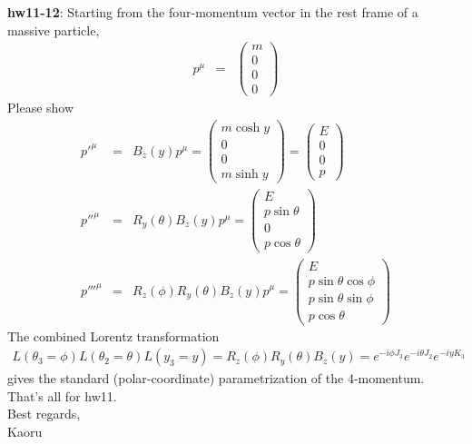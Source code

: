 \documentclass[12pt]{article}
\begin{document}
{\bf hw11-12}:
  Starting from the four-momentum vector in the rest frame of a massive
  particle,
\begin{eqnarray}
  p^\mu &=& 
  \begin{pmatrix}
    m \\ 0 \\ 0 \\ 0
  \end{pmatrix}
\end{eqnarray}
  Please show
\begin{eqnarray}
  {p'}^\mu &=& B_z(y) p^\mu =
  \begin{pmatrix}
    m \cosh y \\ 0 \\ 0 \\ m \sinh y 
  \end{pmatrix}
  =
  \begin{pmatrix}
   E \\ 0 \\ 0 \\ p
  \end{pmatrix} \\
 {p{''}}^\mu &=& R_y(\theta)B_z(y) p^\mu =
  \begin{pmatrix}
    E \\ p \sin\theta \\ 0 \\ p\cos\theta
  \end{pmatrix} \\
  {p{'''}}^\mu &=& R_z(\phi)R_y(\theta)B_z(y) p^\mu =
  \begin{pmatrix}
    E \\ p\sin\theta\cos\phi \\ p\sin\theta\sin\phi \\ p\cos\theta
  \end{pmatrix}
\end{eqnarray}
  The combined Lorentz transformation
\begin{eqnarray}
  L(\theta_3=\phi) L(\theta_2=\theta) L(y_3=y)
  = R_z(\phi)          R_y(\theta)          B_z(y)
  = e^{ -i\phi J_3 } e^{ -i\theta J_2 } e^{ -iy K_3 }
\end{eqnarray}
gives the standard (polar-coordinate) parametrization of the 4-momentum.\\

That's all for hw11.\\

Best regards,\\

Kaoru
\end{document}
